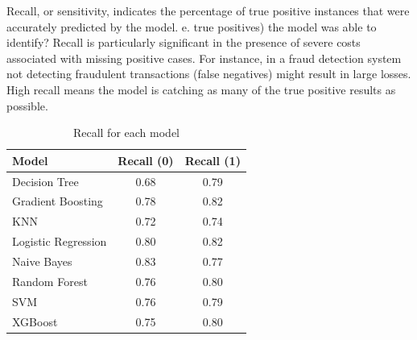 Recall, or sensitivity, indicates the percentage of true positive instances that were accurately predicted by the model. e. true positives) the model was able to identify? Recall is particularly significant in the presence of severe costs associated with missing positive cases. For instance, in a fraud detection system not detecting fraudulent transactions (false negatives) might result in large losses. High recall means the model is catching as many of the true positive results as possible.
\begin{table}[H]
\centering
\begin{tabular}{|l|c|c|}
\hline
\textbf{Model} & \textbf{Recall (0)} & \textbf{Recall (1)} \\
\hline
Decision Tree       & 0.68 & 0.79 \\\hline
Gradient Boosting   & 0.78 & 0.82 \\\hline
KNN                 & 0.72 & 0.74 \\\hline
Logistic Regression & 0.80 & 0.82 \\\hline
Naive Bayes         & 0.83 & 0.77 \\\hline
Random Forest       & 0.76 & 0.80 \\\hline
SVM                 & 0.76 & 0.79 \\\hline
XGBoost             & 0.75 & 0.80 \\
\hline
\end{tabular}
\caption{Recall for each model}
\end{table}



